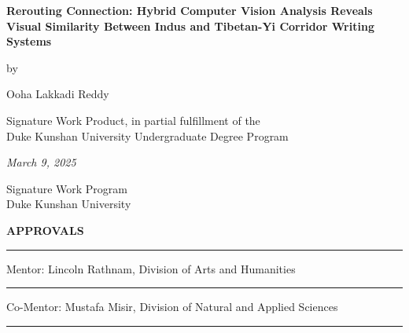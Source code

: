 \documentclass[11pt,a4paper,oneside]{report}
\begin{document}
\newcommand{\authorname}{Ooha Lakkadi Reddy}

\newcommand{\thetitle}{Rerouting Connection: Hybrid Computer Vision Analysis Reveals Visual Similarity Between Indus and Tibetan-Yi Corridor Writing Systems}

\newcommand{\submissiondate}{March 9, 2025}

\newcommand{\mentor}{Lincoln Rathnam}

\newcommand{\academicunit}{Division of Arts and Humanities}

\newcommand{\comentor}{Mustafa Misir}

\newcommand{\coacademicunit}{Division of Natural and Applied Sciences}



\begin{titlepage}

\vspace*{\bigskipamount}

\begin{center}
{\sffamily\LARGE\bfseries\MakeUppercase\thetitle\par}

\bigskip

by

\bigskip

{\Large \authorname}

\bigskip

Signature Work Product, in partial fulfillment of the \\
Duke Kunshan University Undergraduate Degree Program

\bigskip

\emph{\submissiondate}

\bigskip

Signature Work Program \\
Duke Kunshan University

\end{center}

\vfill

\textbf{\textsf{APPROVALS}}

\bigskip\bigskip\bigskip
\hrule

Mentor: \mentor, \academicunit

\bigskip\bigskip\bigskip
\hrule

Co-Mentor: \comentor, \coacademicunit

\bigskip\bigskip\bigskip
\hrule

\end{titlepage}
\end{document}
